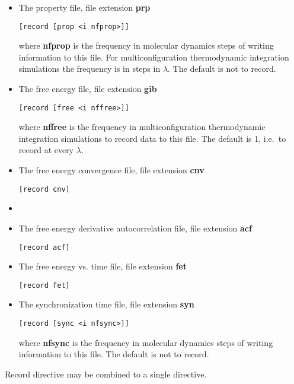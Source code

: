 \begin{itemize}
thermodynamic integration simulations the frequency is in
steps in $\lambda$. The default is not to record.
\item
The property file, file extension {\bf prp}
\begin{verbatim}
[record [prop <i nfprop>]]
\end{verbatim}
where {\bf nfprop} is the frequency in molecular dynamics steps
of writing information to this file. For multiconfiguration
thermodynamic integration simulations the frequency is in
steps in $\lambda$. The default is not to record.
\item
The free energy file, file extension {\bf gib}
\begin{verbatim}
[record [free <i nffree>]]
\end{verbatim}
where {\bf nffree} is the frequency in multiconfiguration
thermodynamic integration simulations to record data to this file.
The default is 1, i.e.\ to record at every $\lambda$.
\item
The free energy convergence file, file extension {\bf cnv}
\begin{verbatim}
[record cnv]
\end{verbatim}
\item
\item
The free energy derivative autocorrelation file, file extension {\bf acf}
\begin{verbatim}
[record acf]
\end{verbatim}
\item
The free energy vs. time file, file extension {\bf fet}
\begin{verbatim}
[record fet]
\end{verbatim}
\item
The synchronization time file, file extension {\bf syn}
\begin{verbatim}
[record [sync <i nfsync>]]
\end{verbatim}
where {\bf nfsync} is the frequency in molecular dynamics steps
of writing information to this file. The default is not to record.
\end{itemize}
Record directive may be combined to a single directive.
